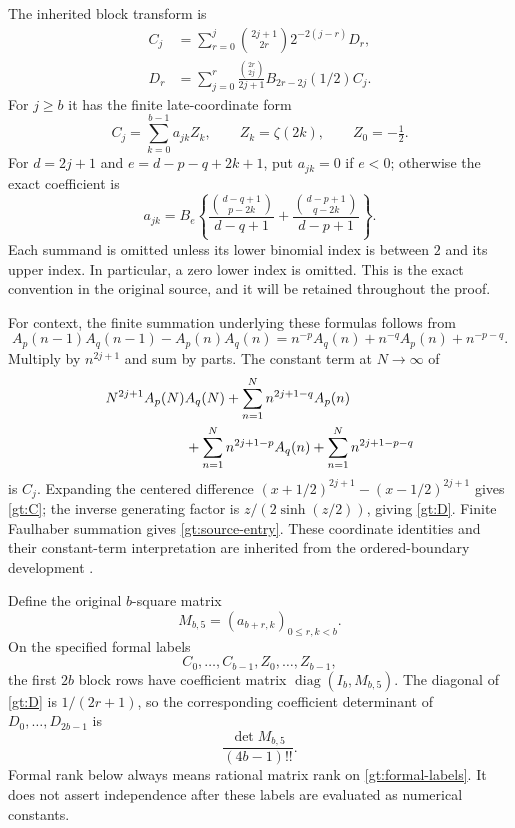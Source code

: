 The inherited block transform is
\begin{align}
 C_j&=\sum_{r=0}^{j}\binom{2j+1}{2r}2^{-2(j-r)}D_r,
       \label{gt:C}\\
 D_r&=\sum_{j=0}^{r}\frac{\binom{2r}{2j}}{2j+1}
                      B_{2r-2j}(1/2)C_j.\label{gt:D}
\end{align}
For $j\ge b$ it has the finite late-coordinate form
\begin{equation}\label{gt:late}
 C_j=\sum_{k=0}^{b-1}a_{jk}Z_k,\qquad
 Z_k=\zeta(2k),\qquad Z_0=-\tfrac12.
\end{equation}
For $d=2j+1$ and $e=d-p-q+2k+1$, put $a_{jk}=0$ if $e<0$;
otherwise the exact coefficient is
\begin{equation}\label{gt:source-entry}
 a_{jk}=B_e\left\{
 \frac{\binom{d-q+1}{p-2k}}{d-q+1}
 +\frac{\binom{d-p+1}{q-2k}}{d-p+1}\right\}.
\end{equation}
Each summand is omitted unless its lower binomial index is between
$2$ and its upper index. In particular, a zero lower index is omitted.
This is the exact convention in the original source, and it will be
retained throughout the proof.

For context, the finite summation underlying these formulas follows
from
\[
 A_p(n-1)A_q(n-1)-A_p(n)A_q(n)
 =n^{-p}A_q(n)+n^{-q}A_p(n)+n^{-p-q}.
\]
Multiply by $n^{2j+1}$ and sum by parts. The constant term at
$N\to\infty$ of
\begin{align*}
 &N^{2j+1}A_p(N)A_q(N)
 +\sum_{n=1}^{N} n^{2j+1-q}A_p(n)\\
 &\hspace{20mm}+\sum_{n=1}^{N}n^{2j+1-p}A_q(n)
 +\sum_{n=1}^{N}n^{2j+1-p-q}
\end{align*}
is $C_j$. Expanding the centered difference
$(x+1/2)^{2j+1}-(x-1/2)^{2j+1}$ gives \eqref{gt:C};
the inverse generating factor is $z/(2\sinh(z/2))$, giving
\eqref{gt:D}. Finite Faulhaber summation gives
\eqref{gt:source-entry}. These coordinate identities and their
constant-term interpretation are inherited from the ordered-boundary
development \cite{OrderedBoundary}.

Define the original $b$-square matrix
\[
 M_{b,5}=(a_{b+r,k})_{0\le r,k<b}.
\]
On the specified formal labels
\begin{equation}\label{gt:formal-labels}
 C_0,\ldots,C_{b-1},Z_0,\ldots,Z_{b-1},
\end{equation}
the first $2b$ block rows have coefficient matrix
$\operatorname{diag}(I_b,M_{b,5})$.
The diagonal of \eqref{gt:D} is $1/(2r+1)$, so the corresponding
coefficient determinant of $D_0,\ldots,D_{2b-1}$ is
\begin{equation}\label{gt:prefix-det}
                       \frac{\det M_{b,5}}{(4b-1)!!}.
\end{equation}
Formal rank below always means rational matrix rank on
\eqref{gt:formal-labels}. It does not assert independence after
these labels are evaluated as numerical constants.

